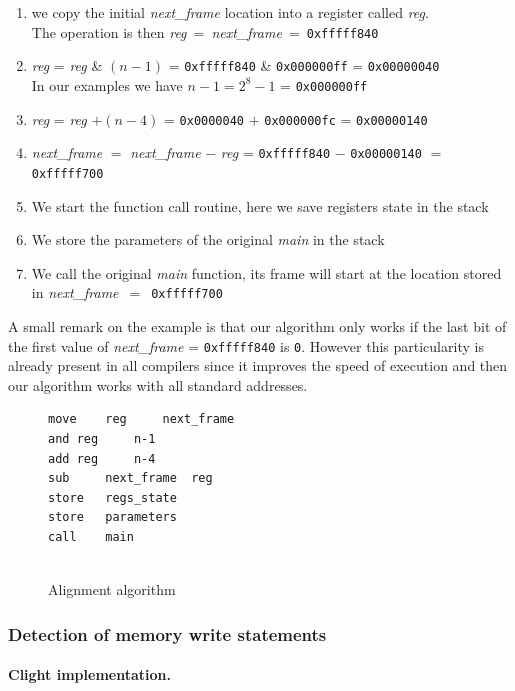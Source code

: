 \documentclass[11pt]{sdm}
\begin{document}
\begin{enumerate}
	\item we copy the initial \textit{next\_frame} location into a register called \textit{reg}.\\
		  The operation is then \textit{reg}~=~\textit{next\_frame}~=~\texttt{0xfffff840}
	\item \textit{reg} = \textit{reg} \& $(n-1)$ = \texttt{0xfffff840} \& \texttt{0x000000ff} = \texttt{0x00000040}\\
		In our examples we have $n-1 = 2^8-1$ = \texttt{0x000000ff}
	\item \textit{reg} = \textit{reg} $+(n-4)$ = \texttt{0x0000040} $+$ \texttt{0x000000fc} = \texttt{0x00000140}
	\item \textit{next\_frame} $=$ \textit{next\_frame} $-$ \textit{reg} = \texttt{0xfffff840} $-$ \texttt{0x00000140} $=$ \texttt{0xfffff700}
	\item We start the function call routine, here we save registers state in the stack
	\item We store the parameters of the original \textit{main} in the stack
	\item We call the original \textit{main} function, its frame will start at the location stored in \textit{next\_frame}~$=$~\texttt{0xfffff700}
\end{enumerate}

A small remark on the example is that our algorithm only works if the last bit of the first value of \textit{next\_frame} = \texttt{0xfffff840} is \texttt{0}. However this particularity is already present in all compilers since it improves the speed of execution and then our algorithm works with all standard addresses.
\begin{figure}[!ht]
\centering
\begin{lstlisting}
move	reg		next_frame  
and	reg		n-1	    
add	reg		n-4    
sub 	next_frame	reg
store 	regs_state
store	parameters
call	main
	
\end{lstlisting}
\caption{Alignment algorithm}
\label{align_algo}
\end{figure}

\subsubsection{Detection of memory write statements}
\label{ssub:Detection of memory write statements}

\paragraph{Clight implementation.}
\label{par:Clight implementation}
\end{document}
